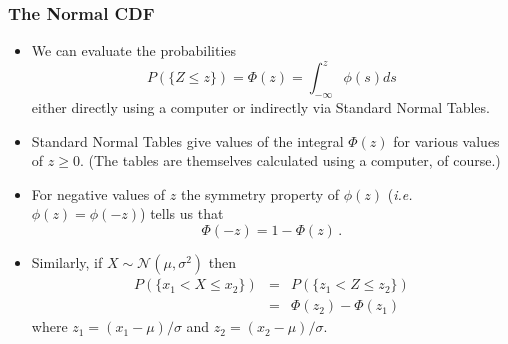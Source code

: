 \documentclass[notes=show,smaller,handout]{beamer}
\renewcommand{\Pr}{P}
\newcommand{\N}{\mathcal{N}}
\newenvironment{stepitemize}{\begin{itemize}[<+->]}{\end{itemize} }
\begin{document}
\begin{frame}%

\frametitle{The Normal CDF}

\begin{stepitemize}
\item We can evaluate the probabilities
$$
\Pr(\{Z\leq z\})=\Phi(z)=\int_{-\infty}^z\phi(s)ds
$$
either directly using a computer or indirectly via Standard Normal
Tables.
\item Standard Normal Tables give values of the integral $\Phi(z)$ for various values of $z\geq 0$. (The tables are themselves
calculated using a computer, of course.)
\item For negative values of $z$ the symmetry property of $\phi(z)$ (\textit{i.e.} $\phi(z)=\phi(-z)$) tells us that
$$
\Phi(-z)=1-\Phi(z)\,.
$$
\item Similarly, if $X\sim \N\left( \mu ,\sigma ^{2}\right) $ then
\begin{eqnarray*}
\Pr(\{x_1<X\leq x_2\})&=&\Pr(\{z_1<Z\leq z_2\})\\
 &=&\Phi(z_2)-\Phi(z_1)
 \end{eqnarray*}
where $z_1=(x_1-\mu)/\sigma$ and $z_2=(x_2-\mu)/\sigma$.

\end{stepitemize}

\end{frame}%
\end{document}
